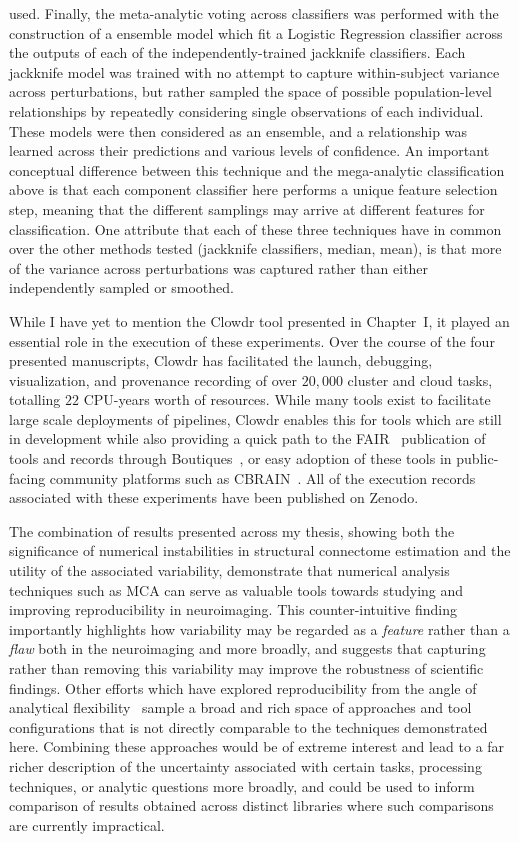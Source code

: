 used. Finally, the meta-analytic voting across classifiers was performed with the construction of a ensemble model
which fit a Logistic Regression classifier across the outputs of each of the independently-trained jackknife
classifiers. Each jackknife model was trained with no attempt to capture within-subject variance across perturbations,
but rather sampled the space of possible population-level relationships by repeatedly considering single observations
of each individual. These models were then considered as an ensemble, and a relationship was learned across their
predictions and various levels of confidence. An important conceptual difference between this technique and the
mega-analytic classification above is that each component classifier here performs a unique feature selection step,
meaning that the different samplings may arrive at different features for classification. One attribute that each of
these three techniques have in common over the other methods tested (jackknife classifiers, median, mean), is that
more of the variance across perturbations was captured rather than either independently sampled or smoothed.

While I have yet to mention the Clowdr tool presented in Chapter~I, it played an essential role in the execution of
these experiments. Over the course of the four presented manuscripts, Clowdr has facilitated the launch, debugging,
visualization, and provenance recording of over $20,000$ cluster and cloud tasks, totalling $22$ CPU-years worth of
resources. While many tools exist to facilitate large scale deployments of pipelines, Clowdr enables this for tools
which are still in development while also providing a quick path to the FAIR~\cite{wilkinson2016fair} publication of
tools and records through Boutiques~\cite{Glatard2018-tu}, or easy adoption of these tools in public-facing
community platforms such as CBRAIN~\cite{sherif2014cbrain}. All of the execution records associated with these
experiments have been published on Zenodo.

The combination of results presented across my thesis, showing both the significance of numerical instabilities in
structural connectome estimation and the utility of the associated variability, demonstrate that numerical analysis
techniques such as MCA can serve as valuable tools towards studying and improving reproducibility in neuroimaging.
This counter-intuitive finding importantly highlights how variability may be regarded as a \textit{feature} rather
than a \textit{flaw} both in the neuroimaging and more broadly, and suggests that capturing rather than removing
this variability may improve the robustness of scientific findings. Other efforts which have explored reproducibility
from the angle of analytical flexibility~\cite{botvinik2020variability,schilling2020tractography} sample a broad and
rich space of approaches and tool configurations that is not directly comparable to the techniques demonstrated here.
Combining these approaches would be of extreme interest and lead to a far richer description of the uncertainty
associated with certain tasks, processing techniques, or analytic questions more broadly, and could be used to inform
comparison of results obtained across distinct libraries where such comparisons are currently impractical.


